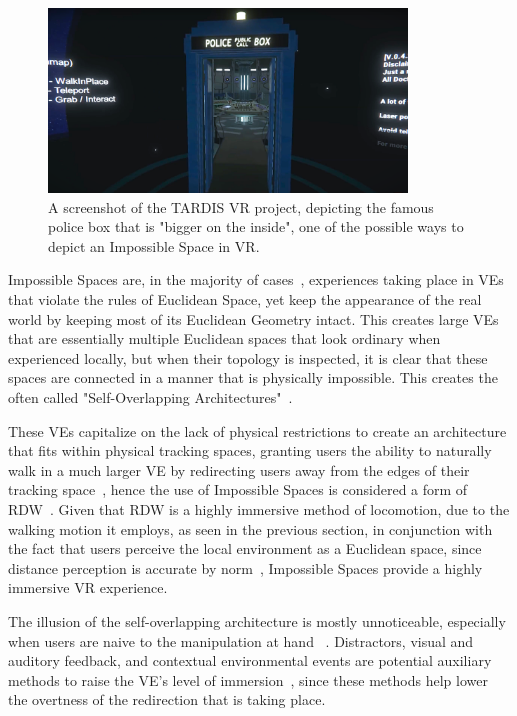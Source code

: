 \begin{figure}[b]
    \centering
    \includegraphics[width=0.85\textwidth]{NOVAthesisFiles/Images/papers/tardis.png}
    \caption[Screenshot of the TARDIS VR project]{A screenshot of the TARDIS VR project, depicting the famous police box that is "bigger on the inside", one of the possible ways to 
    depict an Impossible Space in \gls{VR}.}
    \label{fig:tardis}
\end{figure}

Impossible Spaces are, in the majority of cases~\cite{Lochner2021}, experiences taking place in \glspl{VE} that violate the rules of Euclidean 
Space, yet keep the appearance of the real world by keeping most of its Euclidean Geometry intact. This creates large \glspl{VE} that are essentially 
multiple Euclidean spaces that look ordinary when experienced locally, but when their topology is inspected, it is clear that
these spaces are connected in a manner that is physically impossible. This creates the often called "Self-Overlapping Architectures"~\cite{Lochner2021, Suma2012}.

These \glspl{VE} capitalize on the lack of physical restrictions to create an architecture that fits within physical tracking spaces,
granting users the ability to naturally walk in a much larger \gls{VE} by
redirecting users away from the edges of their tracking space~\cite{Fisher2017, Suma2012, 6550194}, 
hence the use of Impossible Spaces is considered a form of \gls{RDW}~\cite{8255772}.
Given that \gls{RDW} is a highly immersive method of locomotion, due to the walking motion it employs, 
as seen in the previous  section, 
in conjunction with the fact that users perceive the local environment as a Euclidean space, since distance 
perception is accurate by norm~\cite{Barwulor2020}, Impossible Spaces provide a highly immersive \gls{VR} experience. 

The illusion of the self-overlapping architecture is mostly unnoticeable, especially when users are naive to the manipulation at hand 
~\cite{Suma2012}. Distractors, visual and auditory feedback, and contextual environmental events are potential auxiliary methods to 
raise the \gls{VE}'s level of immersion~\cite{Ciumedean2020,Fisher2017}, since these methods help lower the overtness of the redirection that is 
taking place.

